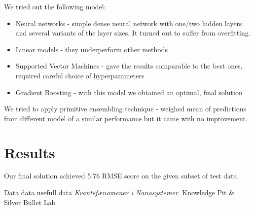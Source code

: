 \documentclass[a4paper]{article}
\begin{document}
We tried out the following model:
\begin{itemize}
\item Neural networks - simple dense neural network with one/two hidden layers and several variants of the layer sizes. It turned out to suffer from overfitting.
\item Linear models - they underperform other methods
\item Supported Vector Machines - gave the results comparable to the best ones, required careful choice of hyperparameters
\item Gradient Boosting - with this model we obtained an optimal, final solution
\end{itemize}



We tried to apply primitive ensembling technique - weighed mean of predictions from different model of a similar performance but it came with no improvement.

\section{Results}
Our final solution achieved 5.76 RMSE score on the given subset of test data.

\begin{thebibliography}{9}
  Data data usefull data
  \emph{Kvantefænomener i Nanosystemer}.
  Knowledge Pit \& Silver Bullet Lab

\end{thebibliography}
\end{document}
